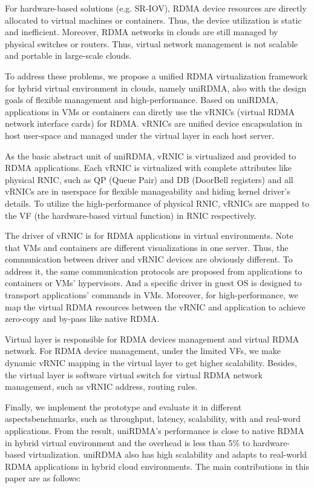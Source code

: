 For hardware-based solutions (e.g. SR-IOV), RDMA device resources are directly allocated to virtual machines or containers. Thus, the device utilization is static and inefficient. Moreover, RDMA networks in clouds are still managed by physical switches or routers. Thus, virtual network management is not scalable and portable in large-scale clouds.

To address these problems, we propose a unified RDMA virtualization framework for hybrid virtual environment in clouds, namely uniRDMA, also with the design goals of flexible management and high-performance. Based on uniRDMA, applications in VMs or containers can diretly use the vRNICs (virtual RDMA network interface cards) for RDMA. vRNICs are unified device encapsulation in host user-space and managed under the virtual layer in each host server.

As the basic abstract unit of uniRDMA, vRNIC is virtualized and provided to RDMA applications. Each vRNIC is virtualized with complete attributes like physical RNIC, such as QP (Queue Pair) and DB (DoorBell registers) and all vRNICs are in userspace for flexible manageability and hiding kernel driver’s details. To utilize the high-performance of physical RNIC, vRNICs are mapped to the VF (the hardware-based virtual function) in RNIC respectively.

The driver of vRNIC is for RDMA applications in virtual environments. Note that VMs and containers are different visualizations in one server. Thus, the communication between driver and vRNIC devices are obviously different. To address it, the same communication protocols are proposed from applications to containers or VMs’ hypervisors. And a specific driver in guest OS is designed to transport applications’ commands in VMs. Moreover, for high-performance, we map the virtual RDMA resources between the vRNIC and application to achieve zero-copy and by-pass like native RDMA.

Virtual layer is responsible for RDMA devices management and virtual RDMA network. For RDMA device management,  under the limited VFs, we make dynamic vRNIC mapping in the virtual layer to get higher scalability. Besides, the virtual layer is software virtual switch for virtual RDMA network management, such as vRNIC address, routing rules.

Finally, we implement the prototype and evaluate it in different aspectsbenchmarks, such as throughput, latency, scalability, with and real-word applications. From the result, uniRDMA’s performance is close to native RDMA in hybrid virtual environment and the overhead is less than 5\% to hardware-based virtualization. uniRDMA also has high scalability and adapts to real-world RDMA applications in hybrid cloud environments. The main contributions in this paper are as follows:

